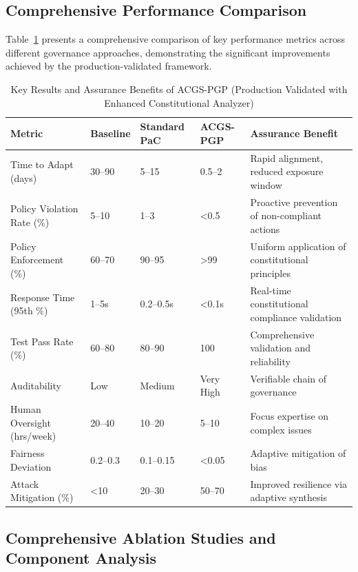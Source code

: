 \subsection{Comprehensive Performance Comparison}

Table~\ref{tab:key_results} presents a comprehensive comparison of key performance metrics across different governance approaches, demonstrating the significant improvements achieved by the production-validated \acgs{} framework.

\begin{table}[!htb]
\centering
\caption{Key Results and Assurance Benefits of ACGS-PGP (Production Validated with Enhanced Constitutional Analyzer)}\label{tab:key_results}
\small
\begin{tabularx}{\textwidth}{@{} l l l l X @{}}
\toprule
\textbf{Metric} & \textbf{Baseline} & \textbf{Standard PaC} & \textbf{ACGS-PGP} & \textbf{Assurance Benefit} \\
\midrule
Time to Adapt (days) & 30--90 & 5--15 & 0.5--2 & Rapid alignment, reduced exposure window \\
Policy Violation Rate (\%) & 5--10 & 1--3 & <0.5 & Proactive prevention of non-compliant actions \\
Policy Enforcement (\%) & 60--70 & 90--95 & >99 & Uniform application of constitutional principles \\
Response Time (95th \%) & 1--5s & 0.2--0.5s & <0.1s & Real-time constitutional compliance validation \\
Test Pass Rate (\%) & 60--80 & 80--90 & 100 & Comprehensive validation and reliability \\
Auditability & Low & Medium & Very High & Verifiable chain of governance \\
Human Oversight (hrs/week) & 20--40 & 10--20 & 5--10 & Focus expertise on complex issues \\
Fairness Deviation & 0.2--0.3 & 0.1--0.15 & <0.05 & Adaptive mitigation of bias \\
Attack Mitigation (\%) & <10 & 20--30 & 50--70 & Improved resilience via adaptive synthesis \\
\bottomrule
\end{tabularx}
\end{table}

\subsection{Comprehensive Ablation Studies and Component Analysis}

